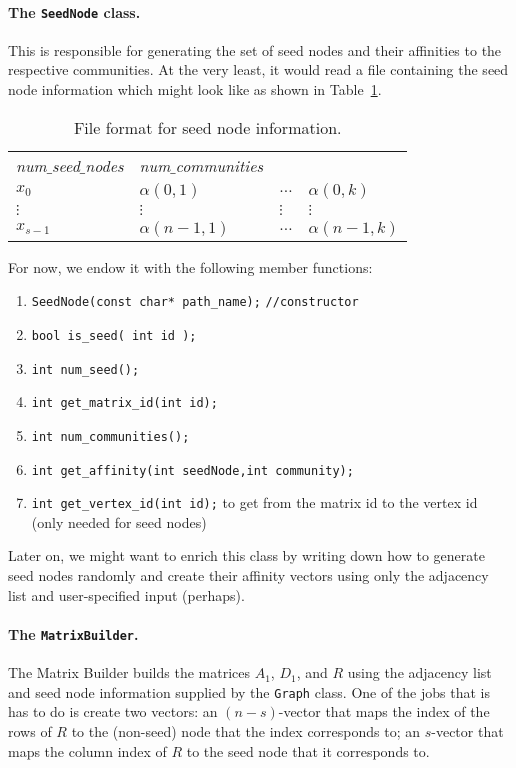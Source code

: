 \documentclass[12pt]{article}
\begin{document}
\paragraph{The \texttt{SeedNode} class.} This is responsible 
for generating the set of seed nodes and their affinities 
to the respective communities. At the very least, it would read 
a file containing the seed node information which might look like 
as shown in Table~\ref{tab:seed_node}. 

\begin{table}[ht]
\centering
\begin{tabular}{llll}
\emph{num$\_$seed$\_$nodes} & \emph{num$\_$communities} &  & \\
$x_0$               & $\alpha(0, 1)$ & $\ldots$ & $\alpha(0, k)$ \\
$\vdots$ & $\vdots$ & $\vdots$ & $\vdots$ \\
$x_{s-1}$  & $\alpha(n-1, 1)$ & $\ldots$ & $\alpha(n-1, k)$ 
\end{tabular}
\caption{File format for seed node information.} \label{tab:seed_node}
\end{table}

For now, we endow it with the following member functions:
\begin{enumerate}
	\item \verb|SeedNode(const char* path_name);| \verb|//constructor|
	\item \verb|bool is_seed( int id );|
  	\item \verb|int num_seed();|
	\item \verb|int get_matrix_id(int id);| 
  	\item \verb|int num_communities();| 
  	\item \verb|int get_affinity(int seedNode,int community);| 
  	\item \verb|int get_vertex_id(int id);| to get from the matrix id to the vertex id (only needed for seed nodes)
\end{enumerate}
Later on, we might want to enrich this class by writing down how 
to generate seed nodes randomly and create their affinity vectors
using only the adjacency list and user-specified input (perhaps). 
	 
\paragraph{The \texttt{MatrixBuilder}.} The Matrix Builder builds the 
matrices $A_1$, $D_1$, and $R$ using the adjacency list and seed node 
information supplied by the \verb|Graph| class. One of the jobs that 
is has to do is create two vectors: an $(n - s)$-vector that maps 
the index of the rows of $R$ to the (non-seed) node that the index 
corresponds to; an $s$-vector that maps the column index of 
$R$ to the seed node that it corresponds to.   
\end{document}
